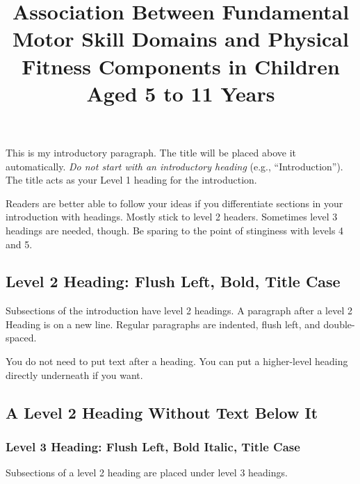 \documentclass[
  man,
  colorlinks=true,linkcolor=blue,citecolor=blue,urlcolor=blue]{apa7}
\title{Association Between Fundamental Motor Skill Domains and Physical
Fitness Components in Children Aged 5 to 11 Years}
\date{}
\begin{document}
\maketitle
\ifdefined\Shaded\renewenvironment{Shaded}{\begin{tcolorbox}[frame hidden, boxrule=0pt, borderline west={3pt}{0pt}{shadecolor}, sharp corners, interior hidden, breakable, enhanced]}{\end{tcolorbox}}\fi
This is my introductory paragraph. The title will be placed above it
automatically. \emph{Do not start with an introductory heading} (e.g.,
``Introduction''). The title acts as your Level 1 heading for the
introduction.

Readers are better able to follow your ideas if you differentiate
sections in your introduction with headings. Mostly stick to level 2
headers. Sometimes level 3 headings are needed, though. Be sparing to
the point of stinginess with levels 4 and 5.

\hypertarget{level-2-heading-flush-left-bold-title-case}{%
\subsection{Level 2 Heading: Flush Left, Bold, Title
Case}\label{level-2-heading-flush-left-bold-title-case}}

Subsections of the introduction have level 2 headings. A paragraph after
a level 2 Heading is on a new line. Regular paragraphs are indented,
flush left, and double-spaced.

You do not need to put text after a heading. You can put a higher-level
heading directly underneath if you want.

\hypertarget{a-level-2-heading-without-text-below-it}{%
\subsection{A Level 2 Heading Without Text Below
It}\label{a-level-2-heading-without-text-below-it}}

\hypertarget{level-3-heading-flush-left-bold-italic-title-case}{%
\subsubsection{Level 3 Heading: Flush Left, Bold Italic, Title
Case}\label{level-3-heading-flush-left-bold-italic-title-case}}

Subsections of a level 2 heading are placed under level 3 headings.
\end{document}
